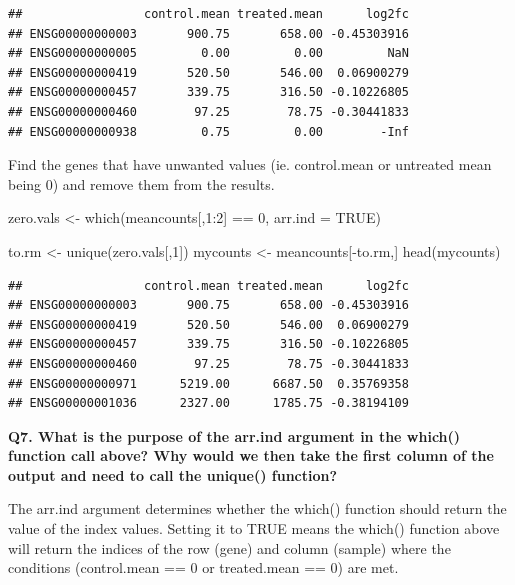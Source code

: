 \documentclass[
]{article}
\newenvironment{Shaded}{\begin{snugshade}}{\end{snugshade}}
\newcommand{\AttributeTok}[1]{\textcolor[rgb]{0.77,0.63,0.00}{#1}}
\newcommand{\ConstantTok}[1]{\textcolor[rgb]{0.00,0.00,0.00}{#1}}
\newcommand{\DecValTok}[1]{\textcolor[rgb]{0.00,0.00,0.81}{#1}}
\newcommand{\FunctionTok}[1]{\textcolor[rgb]{0.00,0.00,0.00}{#1}}
\newcommand{\NormalTok}[1]{#1}
\newcommand{\OtherTok}[1]{\textcolor[rgb]{0.56,0.35,0.01}{#1}}
\newcommand{\SpecialCharTok}[1]{\textcolor[rgb]{0.00,0.00,0.00}{#1}}
\begin{document}
\begin{verbatim}
##                 control.mean treated.mean      log2fc
## ENSG00000000003       900.75       658.00 -0.45303916
## ENSG00000000005         0.00         0.00         NaN
## ENSG00000000419       520.50       546.00  0.06900279
## ENSG00000000457       339.75       316.50 -0.10226805
## ENSG00000000460        97.25        78.75 -0.30441833
## ENSG00000000938         0.75         0.00        -Inf
\end{verbatim}

Find the genes that have unwanted values (ie. control.mean or untreated
mean being 0) and remove them from the results.

\begin{Shaded}
\begin{Highlighting}[]
\NormalTok{zero.vals }\OtherTok{\textless{}{-}} \FunctionTok{which}\NormalTok{(meancounts[,}\DecValTok{1}\SpecialCharTok{:}\DecValTok{2}\NormalTok{] }\SpecialCharTok{==} \DecValTok{0}\NormalTok{, }\AttributeTok{arr.ind =} \ConstantTok{TRUE}\NormalTok{)}

\NormalTok{to.rm }\OtherTok{\textless{}{-}} \FunctionTok{unique}\NormalTok{(zero.vals[,}\DecValTok{1}\NormalTok{])}
\NormalTok{mycounts }\OtherTok{\textless{}{-}}\NormalTok{ meancounts[}\SpecialCharTok{{-}}\NormalTok{to.rm,]}
\FunctionTok{head}\NormalTok{(mycounts)}
\end{Highlighting}
\end{Shaded}

\begin{verbatim}
##                 control.mean treated.mean      log2fc
## ENSG00000000003       900.75       658.00 -0.45303916
## ENSG00000000419       520.50       546.00  0.06900279
## ENSG00000000457       339.75       316.50 -0.10226805
## ENSG00000000460        97.25        78.75 -0.30441833
## ENSG00000000971      5219.00      6687.50  0.35769358
## ENSG00000001036      2327.00      1785.75 -0.38194109
\end{verbatim}

\textbf{Q7. What is the purpose of the arr.ind argument in the which()
function call above? Why would we then take the first column of the
output and need to call the unique() function?}

The arr.ind argument determines whether the which() function should
return the value of the index values. Setting it to TRUE means the
which() function above will return the indices of the row (gene) and
column (sample) where the conditions (control.mean == 0 or treated.mean
== 0) are met.
\end{document}
